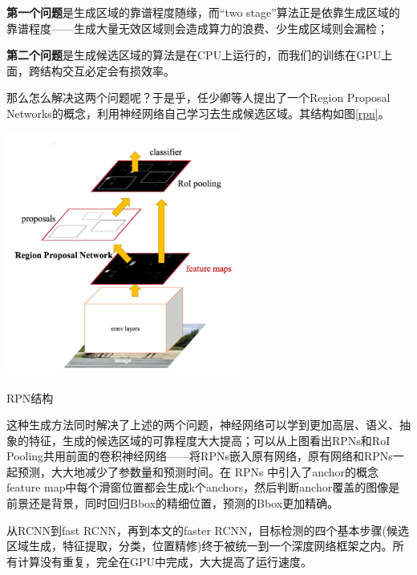 \textbf{第一个问题}是生成区域的靠谱程度随缘，而“two stage”算法正是依靠生成区域的靠谱程度——生成大量无效区域则会造成算力的浪费、少生成区域则会漏检；

\textbf{第二个问题}是生成候选区域的算法是在CPU上运行的，而我们的训练在GPU上面，跨结构交互必定会有损效率。

那么怎么解决这两个问题呢？于是乎，任少卿等人提出了一个Region Proposal Networks的概念，利用神经网络自己学习去生成候选区域。其结构如图\ref{rpn}。
\begin{uscfigure}
	\includegraphics[width=\textwidth,height=8cm]{./Pictures/faster_rcnn.jpg}	
	\caption{RPN结构}	
	\label{rpn}
\end{uscfigure}
这种生成方法同时解决了上述的两个问题，神经网络可以学到更加高层、语义、抽象的特征，生成的候选区域的可靠程度大大提高；可以从上图看出RPNs和RoI Pooling共用前面的卷积神经网络——将RPNs嵌入原有网络，原有网络和RPNs一起预测，大大地减少了参数量和预测时间。在 RPNs 中引入了anchor的概念feature map中每个滑窗位置都会生成k个anchors，然后判断anchor覆盖的图像是前景还是背景，同时回归Bbox的精细位置，预测的Bbox更加精确。

从RCNN到fast RCNN，再到本文的faster RCNN，目标检测的四个基本步骤(候选区域生成，特征提取，分类，位置精修)终于被统一到一个深度网络框架之内。所有计算没有重复，完全在GPU中完成，大大提高了运行速度。

